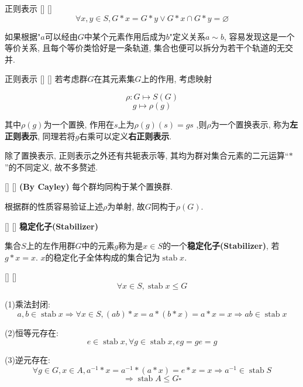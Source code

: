 \documentclass[UTF8]{ctexart}
\DeclareMathOperator{\Stab}{stab}
\begin{document}
		\begin{ppt}
            []
            {正则表示}
            []
            []
			\[\forall x,y\in S, G*x=G*y\vee G*x\cap G*y=\varnothing\]
		\end{ppt}
        如果根据"$a$可以经由$G$中某个元素作用后成为$b$"定义关系$a\sim b$, 容易发现这是一个等价关系, 
        且每个等价类恰好是一条轨道, 集合也便可以拆分为若干个轨道的无交并.

        \begin{dfn}
            []
            {正则表示}
            []
            []
            若考虑群$G$在其元素集$G$上的作用, 考虑映射

            \[\rho: G \mapsto S(G)\]
            \[g \mapsto \rho(g)\]

            其中$\rho(g)$为一个置换, 作用在$s$上为$\rho(g)(s)=gs$ ,则$\rho$为一个置换表示, 称为\textbf{左正则表示}, 同理若将$g$右乘可以定义\textbf{右正则表示}.
        \end{dfn}

        除了置换表示, 正则表示之外还有共轭表示等, 其均为群对集合元素的二元运算“$*$”的不同定义, 故不多赘述.

        \begin{thm}
            []
            {}
            []
            []
            \textbf{(By Cayley)}
            每个群均同构于某个置换群.
       \end{thm}

        \begin{prf}
            根据群的性质容易验证上述$\rho$为单射, 故$G$同构于$\rho(G)$.
        \end{prf}
		
		\begin{dfn}
            []
            {}
            []
            []
			\textbf{稳定化子(Stabilizer)}

			集合$S$上的左作用群$G$中的元素$g$称为是$x\in S$的一个\textbf{稳定化子(Stabilizer)}, 若$g*x=x$. $x$的稳定化子全体构成的集合记为$\Stab x$. 
		\end{dfn}
		
		\begin{ppt}
            []
            {}
            []
            []
			\[\forall x\in S, \Stab x\leq G\]
		\end{ppt}
		
	\begin{prf} 
			
			(1)乘法封闭: 
			\[a,b\in\Stab x\Longrightarrow\forall x\in S, (ab)*x=a*(b*x)=a*x=x\Longrightarrow ab\in\Stab x\]
			
			(2)恒等元存在: 
			\[e\in\Stab x, \forall g\in\Stab x, eg=ge=g\]
			
			(3)逆元存在: 
			\[\forall g\in G,x\in A, a^{-1}*x=a^{-1}*(a*x)=e*x=x\Longrightarrow a^{-1}\in\Stab S\]
			\[\Longrightarrow\Stab A\leq G\square\]
		\end{prf}
  
\end{document}
